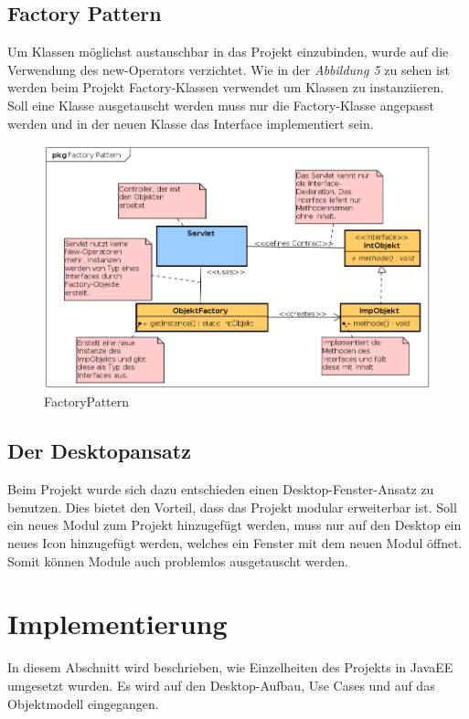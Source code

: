 \documentclass[12pt, a4paper]{article}
\begin{document}
\subsection{Factory Pattern}
Um Klassen möglichst austauschbar in das Projekt einzubinden, wurde auf die Verwendung des \glqq new-Operators\grqq{} verzichtet. Wie in der \textit{Abbildung 5} zu sehen ist werden beim Projekt \glqq Factory-Klassen\grqq{} verwendet um Klassen zu instanziieren. Soll eine Klasse ausgetauscht werden muss nur die Factory-Klasse angepasst werden und in der neuen Klasse das Interface implementiert sein.

\begin{figure}[H]
	\begin{center}
		\includegraphics[width=120mm]{Bilder/FactoryPattern.png}
	\end{center}
	\caption{FactoryPattern}
\end{figure}


\subsection{Der Desktopansatz}
Beim Projekt wurde sich dazu entschieden einen Desktop-Fenster-Ansatz zu benutzen. Dies bietet den Vorteil, dass das Projekt modular erweiterbar ist. Soll ein neues Modul zum Projekt hinzugefügt werden, muss nur auf den Desktop ein neues Icon hinzugefügt werden, welches ein Fenster mit dem neuen Modul öffnet. Somit können Module auch problemlos ausgetauscht werden.

\section{Implementierung}
In diesem Abschnitt wird beschrieben, wie Einzelheiten des Projekts in JavaEE umgesetzt wurden. Es wird auf den Desktop-Aufbau, Use Cases und auf das Objektmodell eingegangen.
\end{document}
